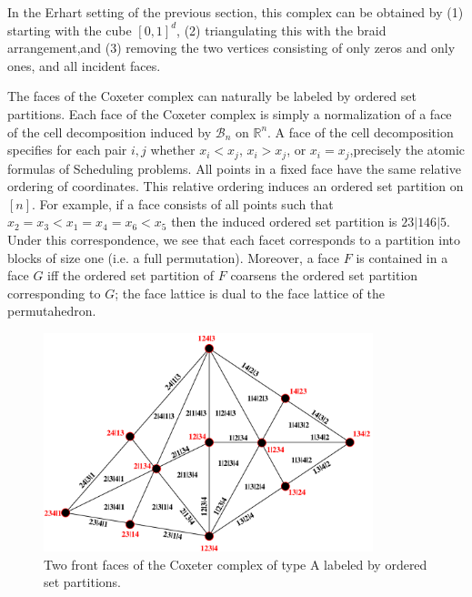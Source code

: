\documentclass[12pt,reqno]{amsart}
\numberwithin{definition}{section}
\begin{document}
 In the Erhart setting of the previous section, this complex
can be obtained by (1) starting with the cube $[0,1]^d$, (2) triangulating 
this with the braid arrangement,and (3) removing the two vertices consisting of 
only zeros and only ones, and all incident faces. 


The faces of the Coxeter complex can naturally be labeled by ordered
set partitions.  Each face of the Coxeter complex is simply a
normalization of a face of the cell decomposition induced by
$\mathcal{B}_n$ on $\mathbb{R}^n$.  A face of the cell decomposition specifies for each pair $i,j$ whether $x_i < x_j$, $x_i > x_j$, or $x_i = x_j$,precisely the atomic formulas of Scheduling problems.  All points in a fixed face have
the same relative ordering of coordinates.  This relative ordering
induces an ordered set partition on $[n]$.  For example, if a face
consists of all points such that $x_2 = x_3 < x_1 =
x_4 = x_6 < x_5$ then the induced ordered set partition is
$23|146|5$.  Under this correspondence, we see that each facet
corresponds to a partition into blocks of size one (i.e. a full
permutation).  Moreover, a face $F$ is contained in a face $G$ iff
the ordered set partition of $F$ coarsens the ordered set partition
corresponding to $G$; the face lattice is dual to the face lattice of the permutahedron.

\begin{figure}[h]
\includegraphics[height=2.5in]{Cox.pdf}
\caption{Two front faces of the Coxeter complex of type A labeled by ordered set partitions.}
\end{figure}


\end{document}
